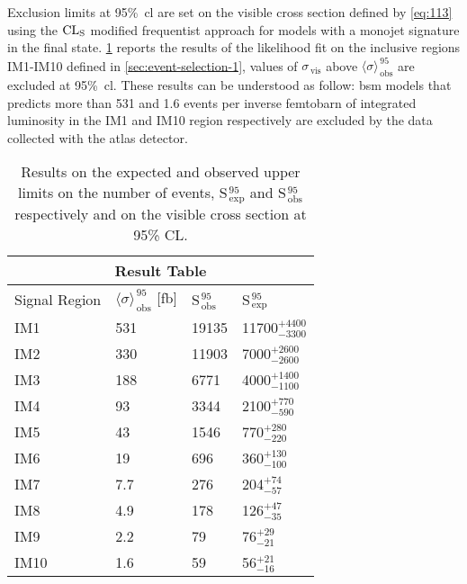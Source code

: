Exclusion limits at 95\%~\gls{cl} are set on the visible cross section defined
by \cref{eq:113} using the $\mathrm{CL}_\mathrm{S}$ modified frequentist approach for models with
a monojet signature in the final state. \cref{tab:cs_vis_results} reports the
results of the likelihood fit on the inclusive regions IM1-IM10 defined in
\cref{sec:event-selection-1}, values of $\sigma_\mathrm{\, vis}$ above
$\langle \sigma \rangle_\mathrm{\, obs}^{\, 95}$ are excluded at
95\%~\gls{cl}. These results can be understood as follow: \gls{bsm} models that
predicts more than 531 and 1.6 events per inverse femtobarn of integrated
luminosity in the IM1 and IM10 region respectively are excluded by the data
collected with the \gls{atlas} detector.
\begin{table}[!h]
  \centering
  \begin{tabular}{llll}
    \toprule
    \multicolumn{4}{c}{Result Table} \\
    \midrule \midrule
    Signal Region & $\langle \sigma \rangle_\mathrm{\, obs}^{\, 95}$ [fb] & S$_\mathrm{\, obs}^{\, 95}$ & S$_\mathrm{\, exp}^{\, 95}$ \\
    \midrule
    IM1 & 531 & 19135 & 11700$^{+4400}_{-3300}$ \B \\
    IM2 & 330 & 11903 &  7000$^{+2600}_{-2600}$ \T \B \\
    IM3 & 188 & 6771  &  4000$^{+1400}_{-1100}$ \T \B \\
    IM4 & 93  & 3344  &  2100$^{+770}_{-590}$ \T \B \\
    IM5 & 43  & 1546  &   770$^{+280}_{-220}$ \T \B \\
    IM6 & 19  & 696   &   360$^{+130}_{-100}$ \T \B\\
    IM7 & 7.7 & 276   &   204$^{+74}_{-57}$ \T \\
    IM8 & 4.9 & 178   &   126$^{+47}_{-35}$ \T \\
    IM9 & 2.2 & 79    &    76$^{+29}_{-21}$ \T \\
    IM10& 1.6 & 59    &    56$^{+21}_{-16}$ \T \\
    \bottomrule
  \end{tabular}
  \caption{Results on the expected and observed upper limits on the number of
    events, S$_\mathrm{\, exp}^{\, 95}$ and S$_\mathrm{\, obs}^{\, 95}$
    respectively and on the visible cross section at 95\% CL.}
  \label{tab:cs_vis_results}
\end{table}
